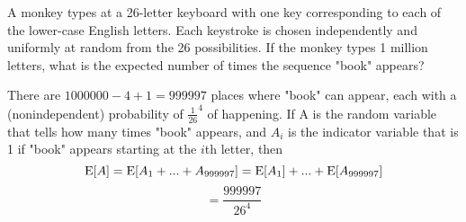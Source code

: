\question A monkey types at a 26-letter keyboard with one key corresponding to each of the lower-case
English letters. Each keystroke is chosen independently and uniformly at random from the 26
possibilities. If the monkey types 1 million letters, what is the expected number of times the
sequence "book" appears?

\begin{solution}[.5 in]
There are $1000000-4+1 = 999997$ places where "book" can appear, each with a (nonindependent)
probability of $\frac{1}{26}^4$ of happening. If A is the random variable that tells how
many times "book" appears, and $A_i$ is the indicator variable that is 1 if "book" appears starting
at the $i$th letter, then
\[\text{E}[A] = \text{E}[A_1 + ... + A_{999997}] = \text{E}[A_1] + ... + \text{E}[A_{999997}]\]
\[=\frac{999997}{26^4}\]
\end{solution}